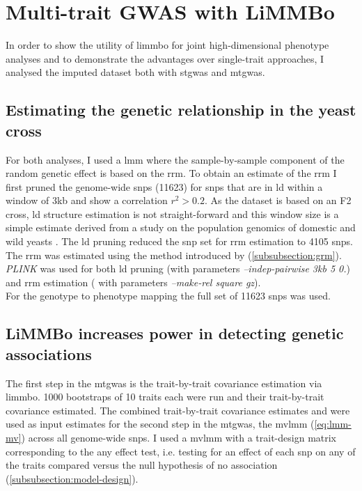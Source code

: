 \newpage
\section{Multi-trait GWAS with LiMMBo}
In order to show the utility of \gls{limmbo} for joint high-dimensional phenotype analyses and to demonstrate the advantages over single-trait approaches, I analysed the imputed dataset both with \gls{stgwas} and \gls{mtgwas}. 

\subsection{Estimating the genetic relationship in the yeast cross}
For both analyses, I used a \gls{lmm} where the sample-by-sample component of the random genetic effect is based on the \gls{rrm}. To obtain an estimate of the \gls{rrm} I first pruned the genome-wide \glspl{snp} (\num{11623}) for \glspl{snp} that are in \gls{ld} within a window of 3kb and show a correlation \(r^2 > 0.2\). As the dataset is based on an F2 cross, \gls{ld} structure estimation is not straight-forward and this window size is a simple estimate derived from a study on the population genomics of domestic and wild yeasts \citep{Liti2009}. The \gls{ld} pruning reduced the \gls{snp} set for \gls{rrm} estimation to \num{4105} \glspl{snp}. The \gls{rrm} was estimated using the method introduced by \citet{Yang2011} (\cref{subsubsection:grm}).
\textit{PLINK} \citep{Chang2015} was used for both \gls{ld} pruning (with parameters  \textit{--indep-pairwise 3kb 5 0.}) and \gls{rrm} estimation ( with parameters \textit{--make-rel square gz}).
\\
For the genotype to phenotype mapping the full set of \num{11623} \glspl{snp} was used.
   
\subsection{LiMMBo increases power in detecting genetic associations}
\label{subsection:power-yeast}
The first step in the \gls{mtgwas} is the trait-by-trait covariance estimation via \gls{limmbo}. \num{1000} bootstraps of \num{10} traits each were run and their trait-by-trait covariance estimated. The combined trait-by-trait covariance estimates  and  were used as input estimates for the second step in the \gls{mtgwas}, the \gls{mvlmm} (\cref{eq:lmm-mv}) across all genome-wide \glspl{snp}. I used a \gls{mvlmm} with a trait-design matrix corresponding to the any effect test, i.e. testing for an effect of each \gls{snp} on any of the traits compared versus the null hypothesis of no association (\cref{subsubsection:model-design}).


